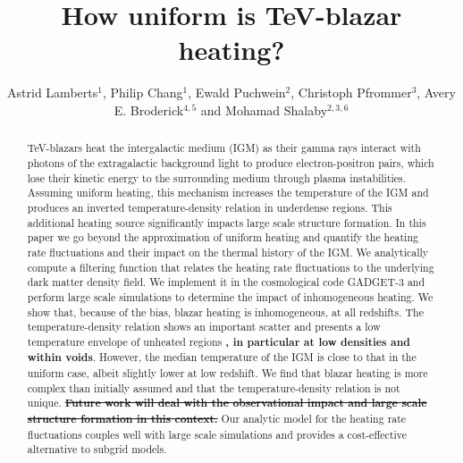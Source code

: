 \documentclass[twocolumns]{emulateapj}
\newcommand\Cc[1]{{\color{blue} \bf #1}} %
\begin{document}
\title{How uniform is TeV-blazar heating?}

\author{Astrid Lamberts$^1$, Philip Chang$^1$, Ewald Puchwein$^2$, Christoph Pfrommer$^3$, Avery E. Broderick$^{4,5}$ and Mohamad Shalaby$^{2,3,6}$}

\begin{abstract}
TeV-blazars heat the intergalactic medium (IGM) as their gamma rays interact with photons of the extragalactic background light to produce electron-positron pairs, which lose their kinetic energy to the surrounding medium through plasma instabilities.  Assuming uniform heating, this mechanism increases the temperature of the IGM and produces an inverted temperature-density relation in underdense regions. This additional heating source significantly impacts large scale structure formation. In this paper we go beyond the approximation of uniform heating and quantify the heating rate fluctuations and their impact on the thermal history of the IGM. We analytically compute a filtering function that relates the heating rate fluctuations to the underlying dark matter density field. We implement it in the cosmological code GADGET-3 and perform large scale simulations to determine the impact of inhomogeneous heating. We show that, because of the bias, blazar heating is inhomogeneous, at all redshifts. The temperature-density relation shows an important scatter and presents a low temperature envelope of unheated regions\Cc{, in particular at low densities and within voids}. However, the median temperature of the IGM is close to that in the uniform case, albeit slightly lower at low redshift. We find that blazar heating is more complex than initially assumed and that the temperature-density relation is not unique. \Cc{\sout{Future work will deal with the observational impact and large scale structure formation in this context.}}  Our analytic model for the heating rate fluctuations couples well with large scale simulations and provides a cost-effective alternative to subgrid models.
\end{abstract}
\end{document}
